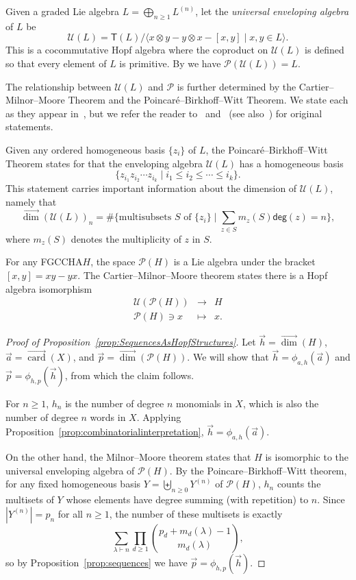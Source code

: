 \documentclass[11pt]{amsart}
\theoremstyle{definition}
\numberwithin{equation}{section}
\newcommand{\FGCCHA}{\textsf{FGCCHA}\xspace}
\newcommand{\vecdim}{\overrightarrow{\dim}}
\newcommand{\veccard}{\overrightarrow{\operatorname{card}}}
\begin{document}
Given a graded Lie algebra $L = \bigoplus_{n \ge 1} L^{(n)}$, let the \emph{universal enveloping algebra} of $L$ be
\[
\mathcal{U}(L) = \mathsf{T}(L) \big/ \big\langle x\otimes y - y \otimes x - [x, y] \;|\; \text{$x, y \in L$} \big\rangle.
\]
This is a cocommutative Hopf algebra where the coproduct on $\mathcal{U}(L)$ is defined so that every element of $L$ is primitive.  By \cite[Theorem 1.4]{Reutenauer-FreeLieAlgebras} we have $\mathcal{P}(\mathcal{U}(L))=L$.  

The relationship between $\mathcal{U}(L)$ and $\mathcal{P}$ is further determined by the Cartier--Milnor--Moore Theorem and the Poincar\'{e}--Birkhoff--Witt Theorem.  We state each as they appear in~\cite[Theorem 4.1.3]{L08}, but we refer the reader to~\cite[Theorem 5.18]{MM65} and~\cite{Cartier57} (see also~\cite[Section 3.8]{Cartier2007}) for original statements.

Given any ordered homogeneous basis $\{z_i\}$ of $L$, the Poincar\'{e}--Birkhoff--Witt Theorem
states for that the enveloping algebra $\mathcal{U}(L)$ has a homogeneous basis
\[
\{ z_{i_1}z_{i_2}\cdots z_{i_k} \;|\; i_1 \leq i_2 \leq \cdots \leq i_k\}.
\]
This statement carries important information about the dimension of $\mathcal{U}(L)$, namely that 
\[
\vecdim(\mathcal{U}(L))_{n}= \#\{\text{multisubsets $S$ of $\{z_{i}\}$} \;|\; \sum_{z \in S} m_{z}(S) \mathsf{deg}(z) = n\},
\]
where $m_{z}(S)$ denotes the multiplicity of $z$ in $S$.

For any \FGCCHA $H$, the space $\mathcal{P}(H)$ is a Lie algebra under the bracket $[x, y] = xy - yx$.  
The Cartier--Milnor--Moore theorem states there is a Hopf algebra isomorphism
\[
\begin{array}{rcl}
\mathcal{U}(\mathcal{P}(H)) &\to& H \\
\mathcal{P}(H) \ni x & \mapsto&  x.
\end{array}
\]

\begin{proof}[Proof of Proposition~\ref{prop:SequencesAsHopfStructures}]
Let $\vec{h} = \vecdim(H)$, $\vec{a} = \veccard(X)$, and $\vec{p} = \vecdim(\mathcal{P}(H))$.  We will show that $\vec{h} = \phi_{a, h}(\vec{a})$ and $\vec{p} = \phi_{h, p}(\vec{h})$, from which the claim follows.  

For $n \ge 1$, $h_{n}$ is the number of degree $n$ monomials in $X$, which is also the number of degree $n$ words in $X$.  
Applying Proposition~\ref{prop:combinatorialinterpretation}, $\vec{h} = \phi_{a, h}(\vec{a})$.

On the other hand, the Milnor--Moore theorem states that $H$ is
isomorphic to the universal enveloping algebra of $\mathcal{P}(H)$.
By the Poincare--Birkhoff--Witt theorem, for any fixed homogeneous basis
$Y = \biguplus_{n \ge 0} Y^{(n)}$ of $\mathcal{P}(H)$, $h_{n}$ counts
the multisets of $Y$ whose elements have degree summing (with repetition)
to $n$.  Since $|Y^{(n)}| = p_{n}$ for all $n \ge 1$, the number of these
multisets is exactly
\[
\sum_{\lambda \vdash n} \prod_{d \geq 1} \binom{p_d + m_d(\lambda) -1}{m_d(\lambda)},
\]
so by Proposition~\ref{prop:sequences} we have $\vec{p} = \phi_{h, p}(\vec{h})$.
\end{proof}
\end{document}
